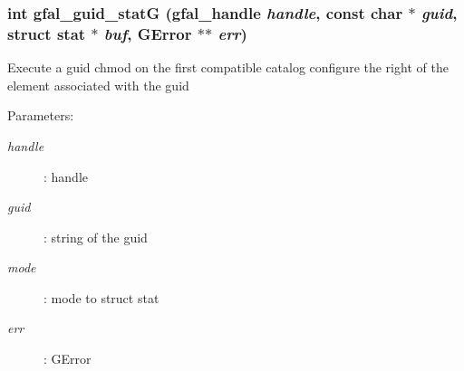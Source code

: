 \subsubsection{\setlength{\rightskip}{0pt plus 5cm}int gfal\_\-guid\_\-stat\-G (gfal\_\-handle {\em handle}, const char $\ast$ {\em guid}, struct stat $\ast$ {\em buf}, GError $\ast$$\ast$ {\em err})}\label{gfal__common__guid_8c_8aebd0a4a29dd4154971395741587405}


Execute a guid chmod on the first compatible catalog configure the right of the element associated with the guid \begin{Desc}
\item[Parameters:]
\begin{description}
\item[{\em handle}]: handle \item[{\em guid}]: string of the guid \item[{\em mode}]: mode to struct stat \item[{\em err}]: GError \end{description}
\end{Desc}

